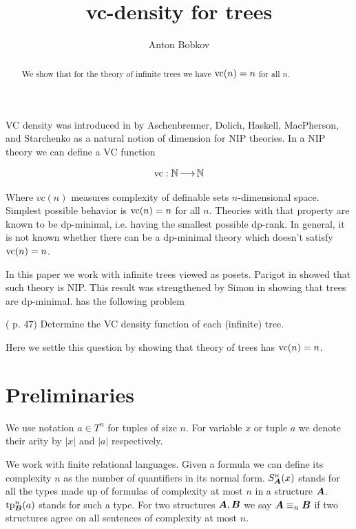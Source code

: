 \documentclass{amsart}
\DeclareMathOperator{\A}{\boldface A}
\DeclareMathOperator{\B}{\boldface B}
\begin{document}
\title{vc-density for trees}
\author{Anton Bobkov}

\begin{abstract}
	We show that for the theory of infinite trees we have $\operatorname{vc}(n) = n$ for all $n$.
\end{abstract}

\maketitle

VC density was introduced in \cite{vc_density} by Aschenbrenner, Dolich, Haskell, MacPherson, and Starchenko as a natural notion of dimension for NIP theories. In a NIP theory we can define a VC function

\begin{align*}
	\operatorname{vc} : \mathbb{N} \operatorname{\longrightarrow} \mathbb{N}
\end{align*}

Where $vc(n)$ measures complexity of definable sets $n$-dimensional space. Simplest possible behavior is $\operatorname{vc}(n) = n$ for all $n$. Theories with that property are known to be dp-minimal, i.e. having the smallest possible dp-rank. In general, it is not known whether there can be a dp-minimal theory which doesn't satisfy $\operatorname{vc}(n)=n$.

In this paper we work with infinite trees viewed as posets. Parigot in \cite{parigot_trees} showed that such theory is NIP. This result was strengthened by Simon in \cite{simon_dp_min} showing that trees are dp-minimal. \cite{vc_density} has the following problem 

\begin{Problem} (\cite{vc_density} p. 47)
	Determine the VC density function of each (infinite) tree.
\end{Problem}

Here we settle this question by showing that theory of trees has $\operatorname{vc}(n) = n$.

\section{Preliminaries}
We use notation $a \in T^n$ for tuples of size $n$. For variable $x$ or tuple $a$ we denote their arity by $|x|$ and $|a|$ respectively.

We work with finite relational languages. Given a formula we can define its complexity $n$ as the number of quantifiers in its normal form. $S^n_{\A}(x)$ stands for all the types made up of formulas of complexity at most $n$ in a structure $\A$. $\tp^n_{\B}(a)$ stands for such a type. For two structures $\A, \B$ we say $\A \equiv_n \B$ if two structures agree on all sentences of complexity at most $n$.
\end{document}
